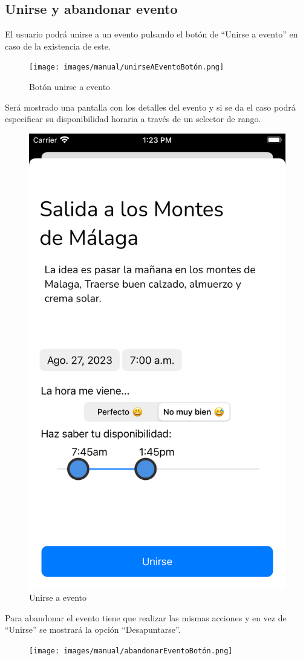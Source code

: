 \begin{appendices}
\section{Unirse y abandonar evento}
El usuario podrá unirse a un evento pulsando el botón de ``Unirse a evento'' en caso de la existencia de este.
\begin{figure}[H]
        \centering
        \texttt{[image: images/manual/unirseAEventoBotón.png]}
        \caption{Botón unirse a evento}
        \label{fig:join_event_button}
\end{figure}
Será mostrado una pantalla con los detalles del evento y si se da el caso podrá especificar su disponibilidad horaria a través de un selector de rango.
\begin{figure}[H]
        \centering
        \includegraphics[cframe=black 2pt,width=0.3\linewidth]{images/manual/unirseAEvento.png}
        \caption{Unirse a evento}
        \label{fig:join_event}
\end{figure}
Para abandonar el evento tiene que realizar las mismas acciones y en vez de ``Unirse'' se mostrará la opción ``Desapuntarse''.
\begin{figure}[H]
        \centering
        \begin{minipage}{0.3\textwidth}
            \centering
            \texttt{[image: images/manual/abandonarEventoBotón.png]}
        \end{minipage}
        \begin{minipage}{0.3\textwidth}
            \centering

\end{minipage}
\end{figure}
\end{appendices}
